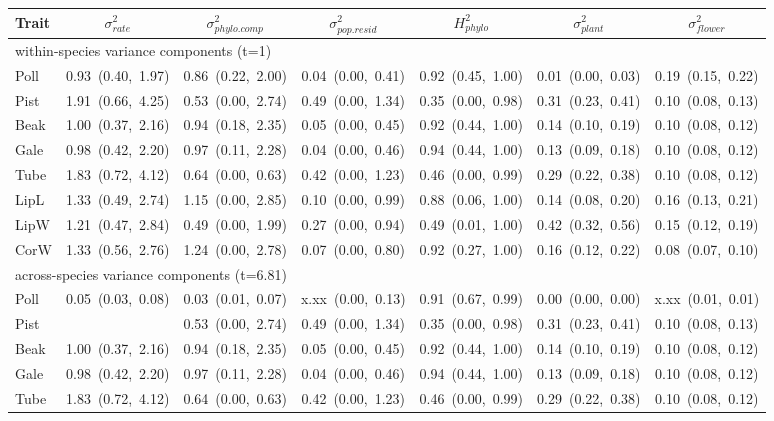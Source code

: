 \documentclass[12pt,letterpaper]{article}
\begin{document}
\begin{table}
\begin{tabular}{lcccccc}
 Trait    &  $\sigma^2_{rate}$  & $\sigma^2_{phylo.comp}$  & $\sigma^2_{pop.resid}$ & $H^2_{phylo}$ & $\sigma^2_{plant}$ & $\sigma^2_{flower}$ \\
\hline
\multicolumn{5}{l}{within-species variance components (t=1) } \\
\hline
Poll   &   0.93~(0.40,~1.97)  & 0.86~(0.22,~2.00)  &  0.04~(0.00,~0.41)  & 0.92~(0.45,~1.00)  & 0.01~(0.00,~0.03) & 0.19~(0.15,~0.22)   \\
Pist   &   1.91~(0.66,~4.25)  & 0.53~(0.00,~2.74)  &  0.49~(0.00,~1.34)  & 0.35~(0.00,~0.98)  & 0.31~(0.23,~0.41) & 0.10~(0.08,~0.13)   \\
Beak   &   1.00~(0.37,~2.16)  & 0.94~(0.18,~2.35)  &  0.05~(0.00,~0.45)  & 0.92~(0.44,~1.00)  & 0.14~(0.10,~0.19) & 0.10~(0.08,~0.12)    \\
Gale   &   0.98~(0.42,~2.20)  & 0.97~(0.11,~2.28)  &  0.04~(0.00,~0.46)  & 0.94~(0.44,~1.00)  & 0.13~(0.09,~0.18) & 0.10~(0.08,~0.12)    \\
Tube   &   1.83~(0.72,~4.12)  & 0.64~(0.00,~0.63)  &  0.42~(0.00,~1.23)  & 0.46~(0.00,~0.99)  & 0.29~(0.22,~0.38) & 0.10~(0.08,~0.12)    \\
LipL   &   1.33~(0.49,~2.74)  & 1.15~(0.00,~2.85)  &  0.10~(0.00,~0.99)  & 0.88~(0.06,~1.00)  & 0.14~(0.08,~0.20) & 0.16~(0.13,~0.21)     \\
LipW   &   1.21~(0.47,~2.84)  & 0.49~(0.00,~1.99)  &  0.27~(0.00,~0.94)  & 0.49~(0.01,~1.00)  & 0.42~(0.32,~0.56) & 0.15~(0.12,~0.19)    \\
CorW   &   1.33~(0.56,~2.76)  & 1.24~(0.00,~2.78)  &  0.07~(0.00,~0.80)  & 0.92~(0.27,~1.00)  & 0.16~(0.12,~0.22) & 0.08~(0.07,~0.10)    \\
\hline
\multicolumn{5}{l}{across-species variance components (t=6.81) } \\
\hline
Poll   &   0.05~(0.03,~0.08)  & 0.03~(0.01,~0.07)  &  x.xx~(0.00,~0.13)  &  0.91~(0.67,~0.99) & 0.00~(0.00,~0.00) & x.xx~(0.01,~0.01)    \\
Pist   &                      & 0.53~(0.00,~2.74)  &  0.49~(0.00,~1.34)  & 0.35~(0.00,~0.98)  & 0.31~(0.23,~0.41) & 0.10~(0.08,~0.13)    \\
Beak   &   1.00~(0.37,~2.16)  & 0.94~(0.18,~2.35)  &  0.05~(0.00,~0.45)  & 0.92~(0.44,~1.00)  & 0.14~(0.10,~0.19) & 0.10~(0.08,~0.12)    \\
Gale   &   0.98~(0.42,~2.20)  & 0.97~(0.11,~2.28)  &  0.04~(0.00,~0.46)  & 0.94~(0.44,~1.00)  & 0.13~(0.09,~0.18) & 0.10~(0.08,~0.12)    \\
Tube   &   1.83~(0.72,~4.12)  & 0.64~(0.00,~0.63)  &  0.42~(0.00,~1.23)  & 0.46~(0.00,~0.99)  & 0.29~(0.22,~0.38) & 0.10~(0.08,~0.12)    \\

\end{tabular}
\end{table}
\end{document}
